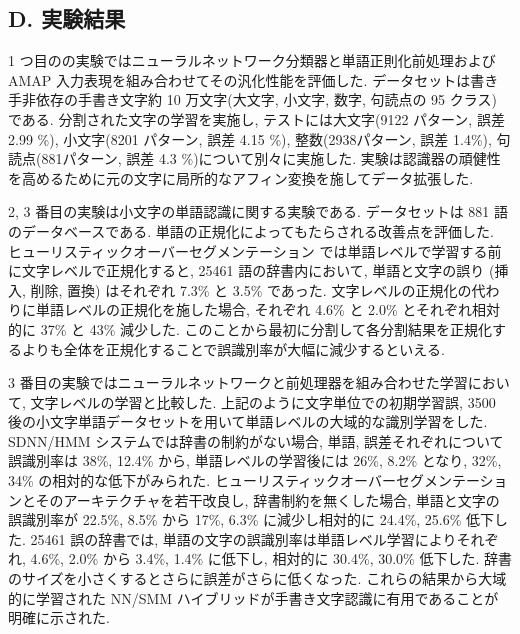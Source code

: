 \documentclass[twocolumn]{jarticle}     %
\begin{document}
\subsection*{D. 実験結果}
1 つ目のの実験ではニューラルネットワーク分類器と単語正則化前処理および AMAP 入力表現を組み合わせてその汎化性能を評価した. データセットは書き手非依存の手書き文字約 10 万文字(大文字, 小文字, 数字, 句読点の 95 クラス) である. 分割された文字の学習を実施し, テストには大文字(9122 パターン, 誤差 2.99 \%), 小文字(8201 パターン, 誤差 4.15 \%), 整数(2938パターン, 誤差 1.4\%), 句読点(881パターン, 誤差 4.3 \%)について別々に実施した. 実験は認識器の頑健性を高めるために元の文字に局所的なアフィン変換を施してデータ拡張した. 
\par
2, 3 番目の実験は小文字の単語認識に関する実験である. データセットは 881 語のデータベースである. 単語の正規化によってもたらされる改善点を評価した. ヒューリスティックオーバーセグメンテーション では単語レベルで学習する前に文字レベルで正規化すると, 25461 語の辞書内において, 単語と文字の誤り (挿入, 削除, 置換) はそれぞれ 7.3\% と 3.5\% であった. 文字レベルの正規化の代わりに単語レベルの正規化を施した場合, それぞれ 4.6\% と 2.0\% とそれぞれ相対的に 37\% と 43\% 減少した. 
このことから最初に分割して各分割結果を正規化するよりも全体を正規化することで誤識別率が大幅に減少するといえる.
\par
3 番目の実験ではニューラルネットワークと前処理器を組み合わせた学習において, 文字レベルの学習と比較した. 上記のように文字単位での初期学習誤, 3500 後の小文字単語データセットを用いて単語レベルの大域的な識別学習をした. 
SDNN/HMM システムでは辞書の制約がない場合, 単語, 誤差それぞれについて誤識別率は 38\%, 12.4\% から, 単語レベルの学習後には 26\%, 8.2\% となり, 32\%, 34\% の相対的な低下がみられた. ヒューリスティックオーバーセグメンテーションとそのアーキテクチャを若干改良し, 辞書制約を無くした場合, 単語と文字の誤識別率が 22.5\%, 8.5\% から 17\%, 6.3\% に減少し相対的に 24.4\%, 25.6\% 低下した. 25461 誤の辞書では, 単語の文字の誤識別率は単語レベル学習によりそれぞれ, 4.6\%, 2.0\% から 3.4\%, 1.4\% に低下し, 相対的に 30.4\%, 30.0\% 低下した. 
辞書のサイズを小さくするとさらに誤差がさらに低くなった. これらの結果から大域的に学習された NN/SMM ハイブリッドが手書き文字認識に有用であることが明確に示された.
\end{document}
